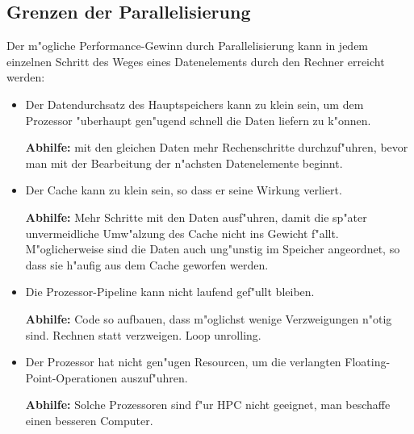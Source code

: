 \subsection{Grenzen der Parallelisierung}
Der m"ogliche Performance-Gewinn durch Parallelisierung kann in jedem einzelnen
Schritt des Weges eines Datenelements durch den Rechner erreicht werden:
\begin{itemize}
\item Der Datendurchsatz des Hauptspeichers kann zu klein sein, um dem 
Prozessor "uberhaupt gen"ugend schnell die Daten liefern zu k"onnen.

{\bf Abhilfe:} mit den gleichen Daten mehr
Rechenschritte durchzuf"uhren, bevor man mit der
Bearbeitung der n"achsten Datenelemente beginnt.
\item Der Cache kann zu klein sein, so dass er seine Wirkung verliert.

{\bf Abhilfe:}
Mehr Schritte mit den Daten ausf"uhren, damit die sp"ater unvermeidliche
Umw"alzung des Cache nicht ins Gewicht f"allt.
M"oglicherweise sind die Daten auch ung"unstig im Speicher angeordnet,
so dass sie h"aufig aus dem Cache geworfen werden.

\item Die Prozessor-Pipeline kann nicht laufend gef"ullt bleiben.

{\bf Abhilfe:} Code so aufbauen, dass m"oglichst wenige Verzweigungen
n"otig sind. Rechnen statt verzweigen. Loop unrolling.

\item Der Prozessor hat nicht gen"ugen Resourcen, um die verlangten
Floating-Point-Operationen auszuf"uhren. 

{\bf Abhilfe:} Solche Prozessoren sind f"ur HPC nicht geeignet, man
beschaffe einen besseren Computer.
\end{itemize}

